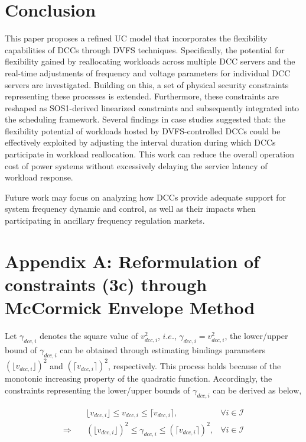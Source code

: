 \documentclass[lettersize,journal]{IEEEtran}
\begin{document}
\section{Conclusion}

This paper proposes a refined UC model that incorporates the flexibility capabilities of DCCs through DVFS techniques. Specifically, the potential for flexibility gained by reallocating workloads across multiple DCC servers and the real-time adjustments of frequency and voltage parameters for individual DCC servers are investigated. Building on this, a set of physical security constraints representing these processes is extended. Furthermore, these constraints are reshaped as SOS1-derived linearized constraints and subsequently integrated into the scheduling framework.
Several findings in case studies suggested that: the flexibility potential of workloads hosted by DVFS-controlled DCCs could be effectively exploited by adjusting the interval duration during which DCCs participate in workload reallocation. This work can reduce the overall operation cost of power systems without excessively delaying the service latency of workload response.

Future work may focus on analyzing how DCCs provide adequate support for system frequency dynamic and control, as well as their impacts when participating in ancillary frequency regulation markets.

\section{Appendix A: Reformulation of constraints (3c) through McCormick Envelope Method}
Let $\gamma_{dcc,i}$ denotes the square value of \(v_{dcc,i}^{2}\), $i.e.$, \(\gamma_{dcc,i} = v_{dcc,i}^{2}\), the lower/upper bound of $\gamma_{dcc,i}$ can be obtained through estimating bindings parameters \((\lfloor v_{dcc,i} \rfloor)^2\) and \((\lceil v_{dcc,i} \rceil)^2\), respectively. This process holds because of the monotonic increasing property of the quadratic function. Accordingly, the constraints representing the lower/upper bounds of \(\gamma_{dcc,i}\)  can be derived as below,

\vspace{-0.25cm}
\begin{subequations}
	\begin{align}
		                  & \lfloor v_{dcc,i} \rfloor \leq v_{dcc,i} \leq \lceil v_{dcc,i} \rceil,                & \forall i \in \mathcal{I} \\
		\Rightarrow \quad & (\lfloor v_{dcc,i} \rfloor )^2 \leq \gamma_{dcc,i}  \leq (\lceil v_{dcc,i} \rceil)^2, & \forall i \in \mathcal{I}
	\end{align}
\end{subequations}
\end{document}
